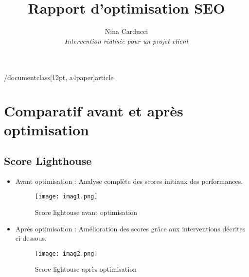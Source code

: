 /documentclass[12pt, a4paper]{article}
\usepackage[utf8]{inputenc}
\usepackage[T1]{fontenc}
\usepackage{graphicx}
\usepackage{amsmath}
\usepackage{lmodern}
\usepackage{geometry}
\usepackage{hyperref}
\usepackage{fancyhdr}
\usepackage{enumitem}

\geometry{margin=1in}
\pagestyle{fancy}
\fancyhf{}
\rhead{\thepage}

\title{\textbf{Rapport d'optimisation SEO}}
\author{
  Nina Carducci\\
  \textit{Intervention réalisée pour un projet client}
}
\date{\vspace{-1.5cm}}



\maketitle
\thispagestyle{empty}

\tableofcontents
\newpage

\section{Comparatif avant et après optimisation}
\subsection{Score Lighthouse}
\begin{itemize}
    \item Avant optimisation : Analyse complète des scores initiaux des performances.
    \begin{figure}[h!] %
    \centering %
    \texttt{[image: imag1.png]} %
    \caption{Score lightouse avant optimisation} %
    \label{imag1.png} %
    \end{figure}
    \newpage
    \item Après optimisation : Amélioration des scores grâce aux interventions décrites ci-dessous.
    \begin{figure}[h!] %
    \centering %
    \texttt{[image: imag2.png]} %
    \caption{Score lightouse après optimisation} %
    \label{imag2.png} %
    \end{figure}
\end{itemize}



